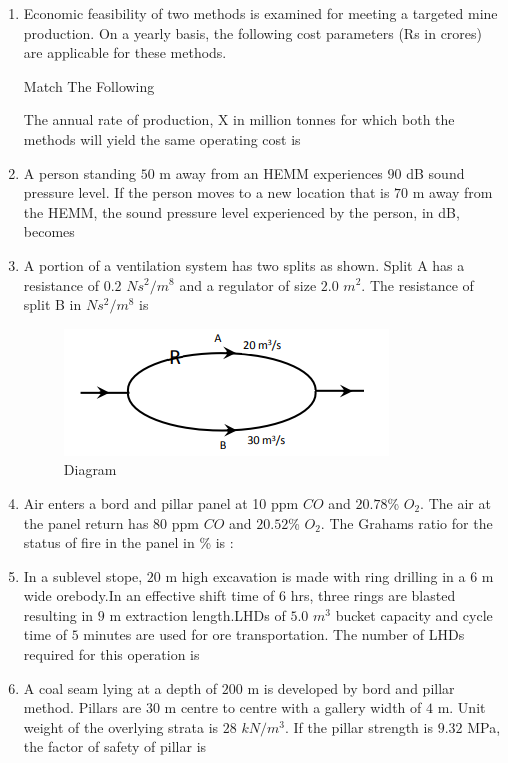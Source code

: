 \documentclass[journal,12pt,onecolumn]{IEEEtran}
\theoremstyle{remark}
\begin{document}
\begin{enumerate}
\item Economic feasibility of two methods is examined for meeting a targeted mine production. On a yearly basis, the following cost parameters (Rs in crores) are applicable for these methods.
\begin{table}[H]
  \centering
  \caption{Match The Following}
  
  \label{tab:Table3}
\end{table}
The annual rate of production, X in million tonnes for which both the methods will yield the same operating cost is 

\hfill{}

\item A person standing $50$ m away from an HEMM experiences $90$ dB sound pressure level. If the person moves to a new location that is $70$ m away from the HEMM, the sound pressure level experienced by the person, in dB, becomes 

\hfill{}
\item A portion of a ventilation system has two splits as shown. Split A has a resistance of $0.2$ $Ns^{2}/m^{8}$
and a regulator of size $2.0$ $m^2$. The resistance of split B in $Ns^{2}/m^{8}$ is
\begin{figure}[H]
  \centering
  \includegraphics[width=0.4\columnwidth]{figs/figure2.png}
  \caption{Diagram}
  \label{fig:figure2}
\end{figure}

\hfill{}
\item Air enters a bord and pillar panel at 10 ppm $CO$  and $20.78$\% $O_2$. The air at the panel return
has $80$ ppm $CO$ and $20.52$\% $O_2$. The Grahams ratio for the status of fire in the panel
in \% is $\colon$ 

\hfill{}
\item In a sublevel stope, $20$ m high excavation is made with ring drilling in a $6$ m wide orebody.In an effective shift time of $6$ hrs, three rings are blasted resulting in $9$ m extraction length.LHDs of $5.0$ $m^3$ bucket capacity and cycle time of $5$ minutes are used for ore transportation. The number of LHDs required for this operation is
\hfill{}
\item A coal seam lying at a depth of $200$ m is developed by bord and pillar method. Pillars are $30$ m centre to centre with a gallery width of $4$ m. Unit weight of the overlying strata is $28$ $kN/m^3$. If the pillar strength is $9.32$ MPa, the factor of safety of pillar is 


\end{enumerate}
\end{document}
